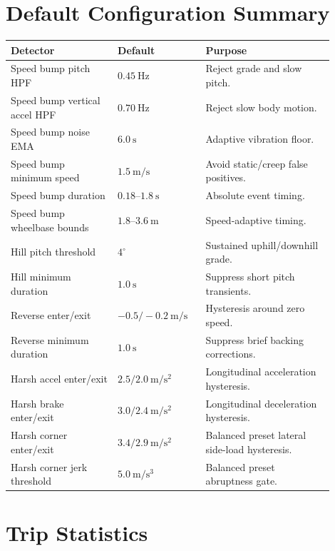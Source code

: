 \documentclass[11pt]{article}
\begin{document}
\section{Default Configuration Summary}

\begin{longtable}{>{\raggedright\arraybackslash}p{0.30\linewidth} >{\raggedright\arraybackslash}p{0.24\linewidth} >{\raggedright\arraybackslash}p{0.36\linewidth}}
\toprule
\textbf{Detector} & \textbf{Default} & \textbf{Purpose} \\
\midrule
Speed bump pitch HPF & \(0.45~\mathrm{Hz}\) & Reject grade and slow pitch. \\
Speed bump vertical accel HPF & \(0.70~\mathrm{Hz}\) & Reject slow body motion. \\
Speed bump noise EMA & \(6.0~\mathrm{s}\) & Adaptive vibration floor. \\
Speed bump minimum speed & \(1.5~\mathrm{m/s}\) & Avoid static/creep false positives. \\
Speed bump duration & \(0.18\)--\(1.8~\mathrm{s}\) & Absolute event timing. \\
Speed bump wheelbase bounds & \(1.8\)--\(3.6~\mathrm{m}\) & Speed-adaptive timing. \\
Hill pitch threshold & \(4^\circ\) & Sustained uphill/downhill grade. \\
Hill minimum duration & \(1.0~\mathrm{s}\) & Suppress short pitch transients. \\
Reverse enter/exit & \(-0.5/-0.2~\mathrm{m/s}\) & Hysteresis around zero speed. \\
Reverse minimum duration & \(1.0~\mathrm{s}\) & Suppress brief backing corrections. \\
Harsh accel enter/exit & \(2.5/2.0~\mathrm{m/s^2}\) & Longitudinal acceleration hysteresis. \\
Harsh brake enter/exit & \(3.0/2.4~\mathrm{m/s^2}\) & Longitudinal deceleration hysteresis. \\
Harsh corner enter/exit & \(3.4/2.9~\mathrm{m/s^2}\) & Balanced preset lateral side-load hysteresis. \\
Harsh corner jerk threshold & \(5.0~\mathrm{m/s^3}\) & Balanced preset abruptness gate. \\
\bottomrule
\end{longtable}

\section{Trip Statistics}
\end{document}
